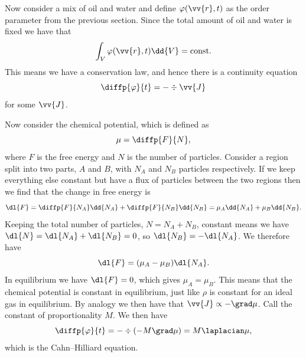 \documentclass[fleqn]{NotesClass}
\begin{document}
    Now consider a mix of oil and water and define \(\varphi(\vv{r}, t)\) as the order parameter from the previous section.
    Since the total amount of oil and water is fixed we have that
    \begin{equation}
        \int_V \varphi(\vv{r}, t) \dd{V} = \text{const}.
    \end{equation}
    This means we have a conservation law, and hence there is a continuity equation
    \begin{equation}
        \diffp{\varphi}{t} = -\div\vv{J}
    \end{equation}
    for some \(\vv{J}\).
    
    Now consider the chemical potential, which is defined as
    \begin{equation}
        \mu = \diffp{F}{N},
    \end{equation}
    where \(F\) is the free energy and \(N\) is the number of particles.
    Consider a region split into two parts, \(A\) and \(B\), with \(N_A\) and \(N_B\) particles respectively.
    If we keep everything else constant but have a flux of particles between the two regions then we find that the change in free energy is
    \begin{equation}
        \dl{F} = \diffp{F}{N_A}\dd{N_A} + \diffp{F}{N_B}\dd{N_B} = \mu_A\dd{N_A} + \mu_B\dd{N_B}.
    \end{equation}
    Keeping the total number of particles, \(N = N_A + N_B\), constant means we have \(\dl{N} = \dl{N_A} + \dl{N_B} = 0\), so \(\dl{N_B} = -\dl{N_A}\).
    We therefore have
    \begin{equation}
        \dl{F} = (\mu_A - \mu_B)\dl{N_A}.
    \end{equation}
    In equilibrium we have \(\dl{F} = 0\), which gives \(\mu_A = \mu_B\).
    This means that the chemical potential is constant in equilibrium, just like \(\rho\) is constant for an ideal gas in equilibrium.
    By analogy we then have that \(\vv{J} \propto -\grad \mu\).
    Call the constant of proportionality \(M\).
    We then have
    \begin{equation}
        \diffp{\varphi}{t} = -\div(-M\grad\mu) = M\laplacian \mu,
    \end{equation}
    which is the Cahn--Hilliard equation.
    
\end{document}
